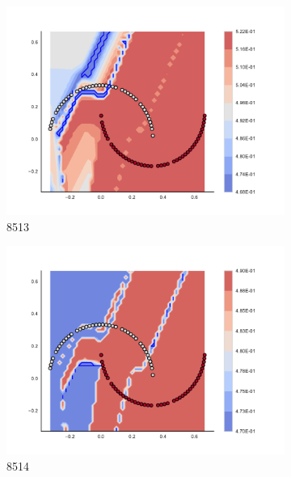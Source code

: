 \begin{figure}[h]
\begin{subfigure}[b]{0.09\textwidth}
    \includegraphics[clip, trim=2.35cm 1.75cm 4.5cm 0cm,width=\textwidth]{img/convergence/8513.pdf}
    \caption{8513}
    \label{fig:convergence_8513}
\end{subfigure}
%
\begin{subfigure}[b]{0.09\textwidth}
    \includegraphics[clip, trim=2.35cm 1.75cm 4.5cm 0cm,width=\textwidth]{img/convergence/8514.pdf}
    \caption{8514}
    \label{fig:convergence_8514}
\end{subfigure}
%
\begin{subfigure}[b]{0.09\textwidth}

\end{subfigure}
\end{figure}
